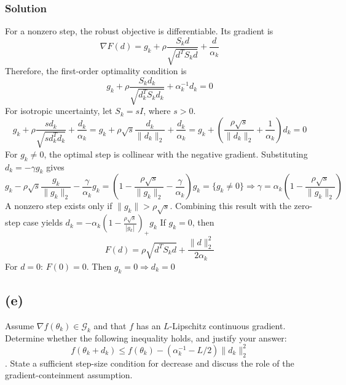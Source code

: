 \subsubsection{Solution}
For a nonzero step, the robust objective is differentiable. Its gradient is
$$\nabla F(d) = g_k + \rho \frac{S_k d}{\sqrt{d^T S_k d}} + \frac{d}{\alpha_k}$$
Therefore, the first-order optimality condition is
$$g_k + \rho \frac{S_k d_k}{\sqrt{d^T_k S_k d_k}} + \alpha^{-1}_k d_k = 0$$
For isotropic uncertainty, let $S_k = s I$, where $s > 0$.
$$g_k + \rho \frac{s d_k}{\sqrt{s d^T_k d_k}} + \frac{d_k}{\alpha_k} = g_k + \rho \sqrt{s} \frac{d_k}{\|d_k\|_2} + \frac{d_k}{\alpha_k} = g_k + \left(\frac{\rho \sqrt{s}}{\|d_k\|_2} + \frac{1}{\alpha_k}\right) d_k = 0$$
For $g_k \neq 0$, the optimal step is collinear with the negative gradient. Substituting $d_k = -\gamma g_k$ gives
$$g_k - \rho \sqrt{s} \frac{g_k}{\|g_k\|_2} - \frac{\gamma}{\alpha_k} g_k= \left(1 - \frac{\rho \sqrt{s}}{\|g_k\|_2} - \frac{\gamma}{\alpha_k}\right) g_k = \{g_k \neq 0\} \Rightarrow \gamma = \alpha_k \left(1 - \frac{\rho \sqrt{s}}{\|g_k\|_2}\right)$$
A nonzero step exists only if $\|g_k\| > \rho \sqrt{s}$. Combining this result with the zero-step case yields
$d_k = -\alpha_k \left(1 - \frac{\rho \sqrt{s}}{|g_k|}\right)_+g_k$
If $g_k = 0$, then
$$F(d) = \rho \sqrt{d^T S_k d} + \frac{\|d\|^2_2}{2 \alpha_k}$$
For $d = 0$: $F(0) = 0$. Then $g_k = 0 \Rightarrow d_k = 0$

\subsection{(e)}
Assume $\nabla f(\theta_k) \in \mathcal{G}_k$ and that $f$ has an $L$-Lipschitz continuous gradient. Determine whether the following inequality holds, and justify your answer: $$f(\theta_k + d_k) \leq  f(\theta_k) - (\alpha^{-1}_k - L/2) \|d_k\|^2_2$$. State a sufficient step-size condition for decrease and discuss the role of the gradient-conteinment assumption.
